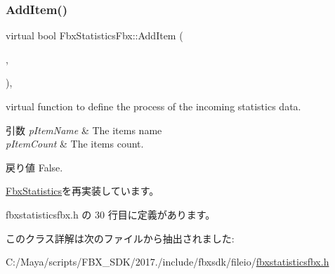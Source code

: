 \subsubsection{\texorpdfstring{Add\+Item()}{AddItem()}}
{\footnotesize\ttfamily virtual bool Fbx\+Statistics\+Fbx\+::\+Add\+Item (\begin{DoxyParamCaption}\item[{\hyperlink{class_fbx_string}{Fbx\+String} \&}]{,  }\item[{int}]{ }\end{DoxyParamCaption})\hspace{0.3cm}{\ttfamily [inline]}, {\ttfamily [virtual]}}

virtual function to define the process of the incoming statistics data. 
\begin{DoxyParams}{引数}
{\em p\+Item\+Name} & The item\textquotesingle{}s name \\
\hline
{\em p\+Item\+Count} & The item\textquotesingle{}s count. \\
\hline
\end{DoxyParams}
\begin{DoxyReturn}{戻り値}
False. 
\end{DoxyReturn}


\hyperlink{class_fbx_statistics_abd81e5b31d33546ad6ba5fa9af34c792}{Fbx\+Statistics}を再実装しています。



 fbxstatisticsfbx.\+h の 30 行目に定義があります。



このクラス詳解は次のファイルから抽出されました\+:\begin{DoxyCompactItemize}
\item 
C\+:/\+Maya/scripts/\+F\+B\+X\+\_\+\+S\+D\+K/2017./include/fbxsdk/fileio/\hyperlink{fbxstatisticsfbx_8h}{fbxstatisticsfbx.\+h}\end{DoxyCompactItemize}
